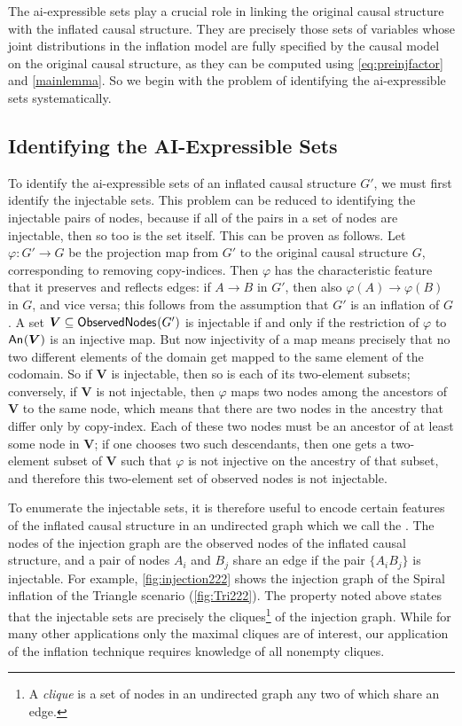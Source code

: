 \documentclass[aps,english,10pt,superscriptaddress,onecolumn,twoside,longbibliography,pra,floatfix,fleqn,nofootinbib]{revtex4-1}
\newcommand*{\tblue}[1]{{\color{medblue}{\textbf{#1}}}}
\theoremstyle{definition}
\newcounter{example}[section]
\newcommand{\An}[2][]{{\mathsf{An}_{#1}}\parenths{#2}}
\newcommand{\SmallNamedFunction}[3][]{\operatorname{\mathsf{#2}}_{#1}\parenths{#3}}
\newcommand{\obsnodes}[1]{\SmallNamedFunction{ObservedNodes}{#1}}
\DeclarePairedDelimiter{\parenths}{\lparen}{\rparen}
\begin{document}
The ai-expressible sets play a crucial role in linking the original causal structure with the inflated causal structure.  They are precisely those sets of variables whose joint distributions in the inflation model are fully specified by the causal model on the original causal structure, as they can be computed using \cref{eq:preinjfactor} and \cref{mainlemma}. So we begin with the problem of identifying the ai-expressible sets systematically.

\subsection{Identifying the AI-Expressible Sets}
\label{step:findpreinjectable}

To identify the ai-expressible sets of an inflated causal structure $G'$, we must first identify the injectable sets. This problem can be reduced to identifying the injectable pairs of nodes, because if all of the pairs in a set of nodes are injectable, then so too is the set itself. This can be proven as follows.   
Let $\varphi : G' \to G$ be the projection map from $G'$ to the original causal structure $G$, corresponding to removing copy-indices.  Then $\varphi$ has the characteristic feature that it preserves and reflects edges: if $A  \to B$ in $G'$, then also $\varphi(A) \to \varphi(B)$ in $G$, and vice versa; this follows from the assumption that $G'$ is an inflation of $G$. 
A set $\bm{V} \subseteq \obsnodes{G'}$ is injectable if and only if the
restriction of $\varphi$ to $\An{\bm{V}}$ is an injective map. 
But now injectivity of a map means precisely that no two different
elements of the domain get mapped to the same element of the codomain.
So if $\bm{V}$ is injectable, then so is each of its two-element subsets;
conversely, if $\bm{V}$ is not injectable, then $\varphi$ maps two nodes among the
ancestors of $\bm{V}$ to the same node, which means that there are two nodes in the
ancestry that differ only by copy-index. Each of these two nodes must be
an ancestor of at least some node in $\bm{V}$; if one chooses two such
descendants, then one gets a two-element subset of $\bm{V}$ such that $\varphi$ is not
injective on the ancestry of that subset, and therefore this two-element
set of observed nodes is not injectable.

To enumerate the injectable sets, it is therefore useful to encode certain features of the inflated causal structure in an undirected graph which we call the \tblue{injection graph}. The nodes of the injection graph are the observed nodes of the inflated causal structure, and a pair of nodes $A_i$ and $B_j$ share an edge if the pair $\{ A_i B_j\}$ is injectable. For example, \cref{fig:injection222} shows the injection graph of the Spiral inflation of the Triangle scenario (\cref{fig:Tri222}).
The property noted above states that the injectable sets are precisely the cliques\footnote{A \emph{clique} is a set of nodes in an undirected graph any two of which share an edge.} of the injection graph.
While for many other applications only the maximal cliques are of interest, our application of the inflation technique requires knowledge of all nonempty cliques. 
\end{document}
